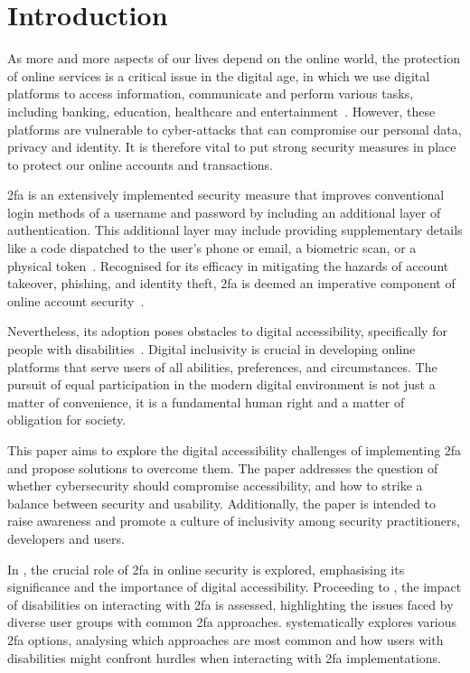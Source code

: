 \section{Introduction}
\label{sec:intro}

As more and more aspects of our lives depend on the online world, the protection of online services is a critical issue in the digital age, in which we use digital platforms to access information, communicate and perform various tasks, including banking, education, healthcare and entertainment~\cite{kraus_2022}. However, these platforms are vulnerable to cyber-attacks that can compromise our personal data, privacy and identity. It is therefore vital to put strong security measures in place to protect our online accounts and transactions.

\acf{2fa} is an extensively implemented security measure that improves conventional login methods of a username and password by including an additional layer of authentication. This additional layer may include providing supplementary details like a code dispatched to the user's phone or email, a biometric scan, or a physical token~\cite{schneier_2005}. Recognised for its efficacy in mitigating the hazards of account takeover, phishing, and identity theft, \ac{2fa} is deemed an imperative component of online account security~\cite{oren_2022}.

Nevertheless, its adoption poses obstacles to digital accessibility, specifically for people with disabilities~\cite{andrew_2023, jain_2019}. Digital inclusivity is crucial in developing online platforms that serve users of all abilities, preferences, and circumstances. The pursuit of equal participation in the modern digital environment is not just a matter of convenience, it is a fundamental human right and a matter of obligation for society.

This paper aims to explore the digital accessibility challenges of implementing \ac{2fa} and propose solutions to overcome them. The paper addresses the question of whether cybersecurity should compromise accessibility, and how to strike a balance between security and usability. Additionally, the paper is intended to raise awareness and promote a culture of inclusivity among security practitioners, developers and users.

In , the crucial role of \ac{2fa} in online security is explored, emphasising its significance and the importance of digital accessibility. Proceeding to , the impact of disabilities on interacting with \ac{2fa} is assessed, highlighting the issues faced by diverse user groups with common \ac{2fa} approaches.  systematically explores various \ac{2fa} options, analysing which approaches are most common and how users with disabilities might confront hurdles when interacting with \ac{2fa} implementations.

